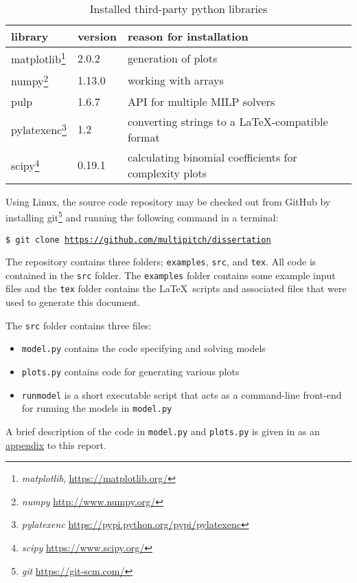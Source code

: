 \begin{table}[h!]
    \centering
    \caption{Installed third-party python libraries}
    \label{tbl.libs}
    \begin{tabular}{l  l  l }
        library & version & reason for installation\\ \hline
        matplotlib\footnote{\emph{matplotlib}, \url{https://matplotlib.org/}}
            & 2.0.2 & generation of plots \\
        numpy\footnote{\emph{numpy} \url{http://www.numpy.org/}} & 1.13.0
            & working with arrays \\
        pulp & 1.6.7 & API for multiple MILP solvers \\
        pylatexenc\footnote{\emph{pylatexenc}
            \url{https://pypi.python.org/pypi/pylatexenc}} & 1.2
            & converting strings to a \LaTeX-compatible format \\
        scipy\footnote{\emph{scipy} \url{https://www.scipy.org/}} & 0.19.1
            & calculating binomial coefficients for complexity plots \\
    \end{tabular}
\end{table}

Using Linux, the source code repository may be checked out from GitHub by
installing
git\footnote{\emph{git} \url{https://git-scm.com/}}
and running the following command in a terminal:

\texttt{\$ git clone \url{https://github.com/multipitch/dissertation}}

The repository contains three folders; \texttt{examples}, \texttt{src}, and
\texttt{tex}.
All code is contained in the \texttt{src} folder.  The \texttt{examples} folder
contains some example input files and the \texttt{tex} folder contains the
\LaTeX\ scripts and associated files that were used to generate this document.

The \texttt{src} folder contains three files:
\begin{itemize}
    \item \texttt{model.py} contains the code specifying and solving models
    \item \texttt{plots.py} contains code for generating various plots
    \item \texttt{runmodel} is a short executable script that acts as a
        command-line front-end for running the models in \texttt{model.py}
\end{itemize}

A brief description of the code in \texttt{model.py} and \texttt{plots.py} is
given in as an \hyperref[C.Appendix2]{appendix} to this report. 

